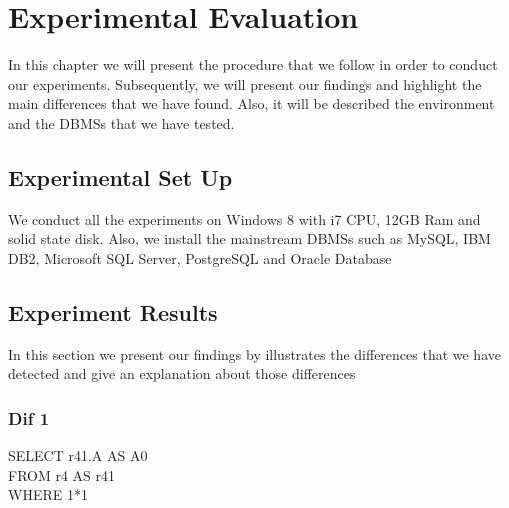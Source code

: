 \chapter{Experimental Evaluation}
In this chapter we will present the procedure that we follow in order to conduct our experiments. Subsequently, we will present our findings and highlight the main differences that we have found. Also, it will be described  the environment and the DBMSs that we have tested.  

\section{Experimental Set Up}
We conduct all the experiments on Windows 8 with i7 CPU, 12GB Ram and solid state disk. Also, we install the mainstream DBMSs such as MySQL, IBM DB2, Microsoft SQL Server, PostgreSQL and Oracle Database

\section{Experiment Results}
In this section we present our findings by illustrates the differences that we have detected and give an explanation about those differences

\subsection{Dif 1}

\begin{mdframed}[backgroundcolor=gray!20] 
SELECT r41.A AS A0
\\FROM r4 AS r41
\\WHERE 1*1
\end{mdframed}

